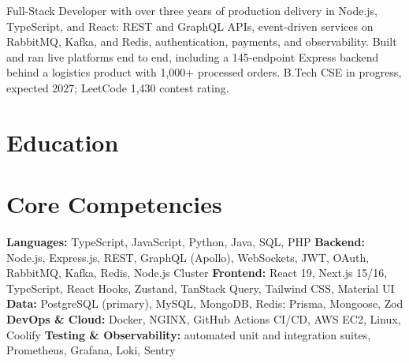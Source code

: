 \documentclass[11pt,a4paper,sans]{moderncv}
\begin{document}
\makecvtitle


\vspace{4pt}
\small{Full-Stack Developer with over three years of production delivery in Node.js, TypeScript, and React: REST and GraphQL APIs, event-driven services on RabbitMQ, Kafka, and Redis, authentication, payments, and observability. Built and ran live platforms end to end, including a 145-endpoint Express backend behind a logistics product with 1,000+ processed orders. B.Tech CSE in progress, expected 2027; LeetCode 1,430 contest rating.}


\section{Education}
\vspace{1pt}


\section{Core Competencies}
\vspace{1pt}
\raggedright
\textbf{Languages:} TypeScript, JavaScript, Python, Java, SQL, PHP \textbar{}
\textbf{Backend:} Node.js, Express.js, REST, GraphQL (Apollo), WebSockets, JWT, OAuth, RabbitMQ, Kafka, Redis, Node.js Cluster \textbar{}
\textbf{Frontend:} React 19, Next.js 15/16, TypeScript, React Hooks, Zustand, TanStack Query, Tailwind CSS, Material UI \textbar{}
\textbf{Data:} PostgreSQL (primary), MySQL, MongoDB, Redis; Prisma, Mongoose, Zod \textbar{}
\textbf{DevOps \& Cloud:} Docker, NGINX, GitHub Actions CI/CD, AWS EC2, Linux, Coolify \textbar{}
\textbf{Testing \& Observability:} automated unit and integration suites, Prometheus, Grafana, Loki, Sentry
\par\normalfont
\end{document}

